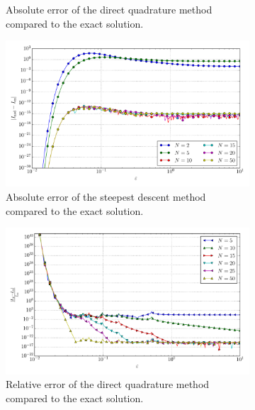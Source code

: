 \documentclass[a4paper,10pt]{article}
\begin{document}
\begin{figure}[ht!]
\begin{subfigure}[t]{0.5\linewidth}
    \caption{Absolute error of the direct quadrature method compared to the exact solution.}
    \label{fig:tp_1d_conv_eps_8_8_err_qr}
  \end{subfigure}
  \begin{subfigure}[t]{0.5\linewidth}
    \includegraphics[width=\linewidth]{./plots/tp_1d_conv_eps_8_8_err_nsd.pdf}
    \caption{Absolute error of the steepest descent method compared to the exact solution.}
    \label{fig:tp_1d_conv_eps_8_8_err_nsd}
  \end{subfigure}
  \begin{subfigure}[t]{0.5\linewidth}
    \includegraphics[width=\linewidth]{./plots/tp_1d_conv_eps_8_8_err_rel_qr.pdf}
    \caption{Relative error of the direct quadrature method compared to the exact solution.}
    \label{fig:tp_1d_conv_eps_8_8_err_qr}
  \end{subfigure}
  \begin{subfigure}[t]{0.5\linewidth}

\end{subfigure}
\end{figure}
\end{document}
